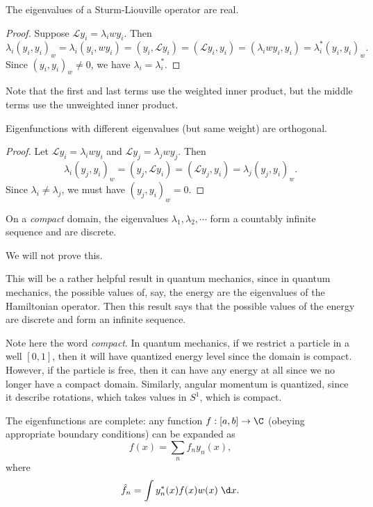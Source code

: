 \documentclass[a4paper]{article}
\begin{document}
\begin{prop}
  The eigenvalues of a Sturm-Liouville operator are real.
\end{prop}

\begin{proof}
  Suppose $\mathcal{L} y_i = \lambda_i w y_i$. Then
  \[
    \lambda_i (y_i, y_i)_w = \lambda_i (y_i, w y_i) = (y_i, \mathcal{L} y_i) = (\mathcal{L} y_i, y_i) = (\lambda_i w y_i, y_i) = \lambda_i^* (y_i, y_i)_w.
  \]
  Since $(y_i, y_i)_w \not= 0$, we have $\lambda_i = \lambda_i^*$.
\end{proof}
Note that the first and last terms use the weighted inner product, but the middle terms use the unweighted inner product.

\begin{prop}
  Eigenfunctions with different eigenvalues (but same weight) are orthogonal.
\end{prop}

\begin{proof}
  Let $\mathcal{L} y_i = \lambda_i w y_i$ and $\mathcal{L} y_j = \lambda_j w y_j$. Then
  \[
    \lambda_i (y_j, y_i)_w = (y_j, \mathcal{L} y_i) = (\mathcal{L} y_j, y_i) = \lambda_j (y_j, y_i)_w.
  \]
  Since $\lambda_i \not= \lambda_j$, we must have $(y_j, y_i)_w = 0$.
\end{proof}

\begin{prop}
  On a \emph{compact} domain, the eigenvalues $\lambda_1, \lambda_2, \cdots$ form a countably infinite sequence and are discrete.
\end{prop}
We will not prove this.

This will be a rather helpful result in quantum mechanics, since in quantum mechanics, the possible values of, say, the energy are the eigenvalues of the Hamiltonian operator. Then this result says that the possible values of the energy are discrete and form an infinite sequence.

Note here the word \emph{compact}. In quantum mechanics, if we restrict a particle in a well $[0, 1]$, then it will have quantized energy level since the domain is compact. However, if the particle is free, then it can have any energy at all since we no longer have a compact domain. Similarly, angular momentum is quantized, since it describe rotations, which takes values in $S^1$, which is compact.

\begin{prop}
  The eigenfunctions are complete: any function $f: [a, b] \to \C$ (obeying appropriate boundary conditions) can be expanded as
  \[
    f(x) = \sum_n f_n y_n(x),
  \]
  where
  \[
    \hat{f}_n = \int y^*_n(x) f(x) w(x)\;\d x.
  \]
\end{prop}
\end{document}
